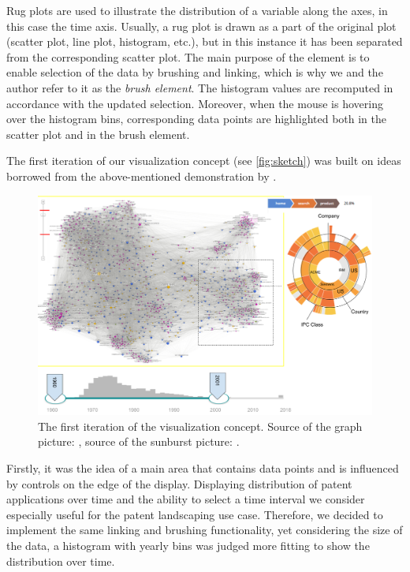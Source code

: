 Rug plots are used to illustrate the distribution of a variable along the axes, in this case the time axis.
Usually, a rug plot is drawn as a part of the original plot (scatter plot, line plot, histogram, etc.), but in this instance it has been separated from the corresponding scatter plot.
The main purpose of the element is to enable selection of the data by brushing and linking, which is why we and the author refer to it as the \textit{brush element}.
The histogram values are recomputed in accordance with the updated selection.
Moreover, when the mouse is hovering over the histogram bins, corresponding data points are highlighted both in the scatter plot and in the brush element.

The first iteration of our visualization concept  (see \autoref{fig:sketch}) was built on ideas borrowed from the above-mentioned demonstration by \cite{Johnson2018}.

\begin{figure}
\includegraphics[width=\textwidth]{img/Visualization_mockup}
\caption{The first iteration of the visualization concept. Source of the graph picture: \cite{Latour2012}, source of the sunburst picture: \cite{Ribecca2019}.}
\label{fig:sketch}
\end{figure}

Firstly, it was the idea of a main area that contains data points and is influenced by controls on the edge of the display.
Displaying distribution of patent applications over time and the ability to select a time interval we consider especially useful for the patent landscaping use case.
Therefore, we decided to implement the same linking and brushing functionality, yet considering the size of the data, a histogram with yearly bins was judged more fitting to show the distribution over time.

